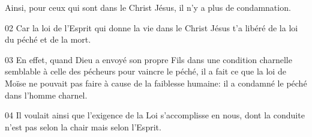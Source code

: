 Ainsi, pour ceux qui sont dans le Christ Jésus, il n’y a plus de condamnation.

02 Car la loi de l’Esprit qui donne la vie dans le Christ Jésus t’a libéré de la loi du péché et de la mort.

03 En effet, quand Dieu a envoyé son propre Fils dans une condition charnelle semblable à celle des pécheurs pour vaincre le péché, il a fait ce que la loi de Moïse ne pouvait pas faire à cause de la faiblesse humaine: il a condamné le péché dans l’homme charnel.

04 Il voulait ainsi que l’exigence de la Loi s’accomplisse en nous, dont la conduite n’est pas selon la chair mais selon l’Esprit.
